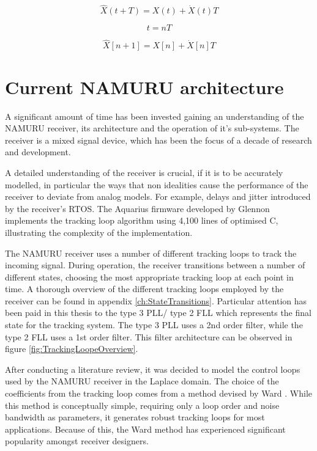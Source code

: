 \begin{equation}
\hat{X}(t+T) = X(t) +  \dot{X}(t) T
\end{equation}

\begin{equation}
t = nT
\end{equation}

\begin{equation}
\hat{X}[n+1] = X[n] +  \dot{X}[n] T
\end{equation}




\section{Current \ac{NAMURU} architecture}
A significant amount of time has been invested gaining an understanding of the \ac{NAMURU} receiver, its architecture and the operation of it's sub-systems. The receiver is a mixed signal device, which has been the focus of a decade of research and development. 

A detailed understanding of the receiver is crucial, if it is to be accurately modelled, in particular the ways that non idealities cause the performance of the receiver to deviate from analog models. For example, delays and jitter introduced  by the receiver's \ac{RTOS}. The Aquarius firmware developed by Glennon \cite{Glennon11aquariusfirmware} implements the tracking loop algorithm using 4,100 lines of optimised C, illustrating the complexity of the implementation.

The \ac{NAMURU} receiver uses a number of different tracking loops to track the incoming signal. During operation, the receiver transitions between a number of different states, choosing the most appropriate tracking loop at each point in time. A thorough overview of the different tracking loops employed by the receiver can be found in appendix \ref{ch:StateTransitions}. Particular attention has been paid in this thesis to the type 3 PLL/ type 2 FLL which represents the final state for the tracking system. The type 3 PLL uses a 2nd order filter, while the type 2 FLL uses a 1st order filter. This filter architecture can be observed in figure \ref{fig:TrackingLoopeOverview}. 



After conducting a literature review, it was decided to model the control loops used by the \ac{NAMURU} receiver in the Laplace domain. The choice of the coefficients from the tracking loop comes from a method devised by Ward \cite{Ward}. While this method is conceptually simple, requiring only a loop order and noise bandwidth as parameters, it generates robust tracking loops for most applications. Because of this, the Ward method has experienced significant popularity amongst receiver designers.  

